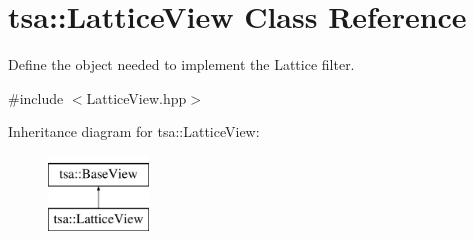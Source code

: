 \hypertarget{classtsa_1_1_lattice_view}{}\section{tsa\+:\+:Lattice\+View Class Reference}
\label{classtsa_1_1_lattice_view}


Define the object needed to implement the Lattice filter.  




{\ttfamily \#include $<$Lattice\+View.\+hpp$>$}

Inheritance diagram for tsa\+:\+:Lattice\+View\+:\begin{figure}[H]
\begin{center}
\leavevmode
\includegraphics[height=2.000000cm]{classtsa_1_1_lattice_view}
\end{center}
\end{figure}
